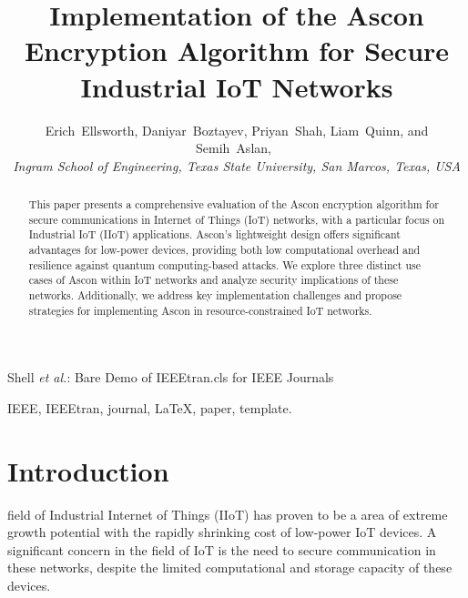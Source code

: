 \documentclass[journal]{IEEEtran}
\begin{document}
\title{Implementation of the Ascon Encryption Algorithm for Secure Industrial IoT Networks}

\author{Erich~Ellsworth,
        Daniyar~Boztayev,
        Priyan~Shah,
        Liam~Quinn,
        and Semih~Aslan,~%

    \textit{Ingram School of Engineering, Texas State University, San Marcos, Texas, USA}

}




%
{Shell \MakeLowercase{\textit{et al.}}: Bare Demo of IEEEtran.cls for IEEE Journals}

\maketitle

\begin{abstract}
This paper presents a comprehensive evaluation of the Ascon encryption algorithm for secure communications in Internet of Things (IoT) networks, with a particular focus on Industrial IoT (IIoT) applications. Ascon's lightweight design offers significant advantages for low-power devices, providing both low computational overhead and resilience against quantum computing-based attacks. We explore three distinct use cases of Ascon within IoT networks and analyze security implications of these networks. Additionally, we address key implementation challenges and propose strategies for implementing Ascon in resource-constrained IoT networks.
\end{abstract}

\begin{IEEEkeywords}
IEEE, IEEEtran, journal, \LaTeX, paper, template.
\end{IEEEkeywords}



\IEEEpeerreviewmaketitle



\section{Introduction}

 field of Industrial Internet of Things (IIoT) has proven to be a area of extreme growth potential with the rapidly shrinking cost of low-power IoT devices. A significant concern in the field of IoT is the need to secure communication in these networks, despite the limited computational and storage capacity of these devices.
\end{document}
